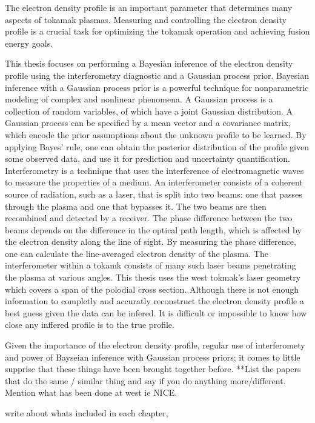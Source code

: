 The electron density profile is an important parameter that determines many aspects of tokamak plasmas. Measuring and controlling the electron density profile is a crucial task for optimizing the tokamak operation and achieving fusion energy goals.

This thesis focuses on performing a Bayesian inference of the electron density profile using the interferometry diagnostic and a Gaussian process prior. Bayesian inference with a Gaussian process prior is a powerful technique for nonparametric modeling of complex and nonlinear phenomena. A Gaussian process is a collection of random variables, of which have a joint Gaussian distribution. A Gaussian process can be specified by a mean vector and a covariance matrix, which encode the prior assumptions about the unknown profile to be learned. By applying Bayes’ rule, one can obtain the posterior distribution of the profile given some observed data, and use it for prediction and uncertainty quantification. Interferometry is a technique that uses the interference of electromagnetic waves to measure the properties of a medium. An interferometer consists of a coherent source of radiation, such as a laser, that is split into two beams: one that passes through the plasma and one that bypasses it. The two beams are then recombined and detected by a receiver. The phase difference between the two beams depends on the difference in the optical path length, which is affected by the electron density along the line of sight. By measuring the phase difference, one can calculate the line-averaged electron density of the plasma. The interferometer within a tokamk consists of many such laser beams penetrating the plasma at various angles. This thesis uses the \gls{west} tokmak's laser geometry which covers a span of the polodial cross section. Although there is not enough information to completly and accuratly reconstruct the electron density profile a best guess given the data can be infered. It is difficult or impossible to know how close any inffered profile is to the true profile.

Given the importance of the electron density profile, regular use of interferomety and power of Bayseian inference with Gaussian process priors; it comes to little supprise that these things have been brought together before. **List the papers that do the same / similar thing and say if you do anything more/different. Mention what has been done at west ie NICE. 


write about whats included in each chapter, 

